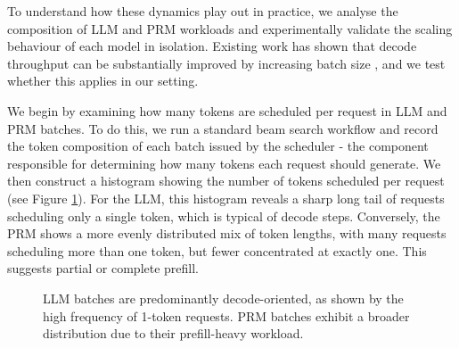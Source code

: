 \documentclass[11pt,twoside]{report}
\begin{document}
To understand how these dynamics play out in practice, we analyse the composition of LLM and PRM workloads and experimentally validate the scaling behaviour of each model in isolation. 
Existing work has shown that decode throughput can be substantially improved by increasing batch size \cite{agrawal2024taming}, and we test whether this applies in our setting.

We begin by examining how many tokens are scheduled per request in LLM and PRM batches. 
To do this, we run a standard beam search workflow and record the token composition of each batch issued by the scheduler - the component responsible for determining how many tokens each request should generate. 
We then construct a histogram showing the number of tokens scheduled per request (see Figure \ref{fig:batch-hist-comparison}). 
For the LLM, this histogram reveals a sharp long tail of requests scheduling only a single token, which is typical of decode steps. 
Conversely, the PRM shows a more evenly distributed mix of token lengths, with many requests scheduling more than one token, but fewer concentrated at exactly one. This suggests partial or complete prefill.

\begin{figure}[htbp]
\centering
{}
\vspace{1em}
\caption{LLM batches are predominantly decode-oriented, as shown by the high frequency of 1-token requests. PRM batches exhibit a broader distribution due to their prefill-heavy workload.}
\label{fig:batch-hist-comparison}
\end{figure}
\end{document}
